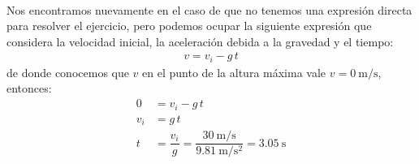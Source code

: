 \documentclass[14pt]{extarticle}
\begin{document}
\begin{enumerate}[label=\roman*)]
\\[0.5em]
Nos encontramos nuevamente en el caso de que no tenemos una expresión directa para resolver el ejercicio, pero podemos ocupar la siguiente expresión que considera la velocidad inicial, la aceleración debida a la gravedad y el tiempo:
\begin{align*}
v = v_{i} - g \, t
\end{align*}
de donde conocemos que $v$ en el punto de la altura máxima vale $v = \SI{0}{\meter\per\second}$, entonces:
\begin{align*}
0 &= v_{i} - g \, t \\[0.5em]
v_{i} &=  g \, t \\[0.5em]
t &= \dfrac{v_{i}}{g} = \dfrac{\SI{30}{\meter\per\second}}{\SI{9.81}{\meter\per\square\second}} = \SI{3.05}{\second}
\end{align*}
\end{enumerate}
\end{document}
